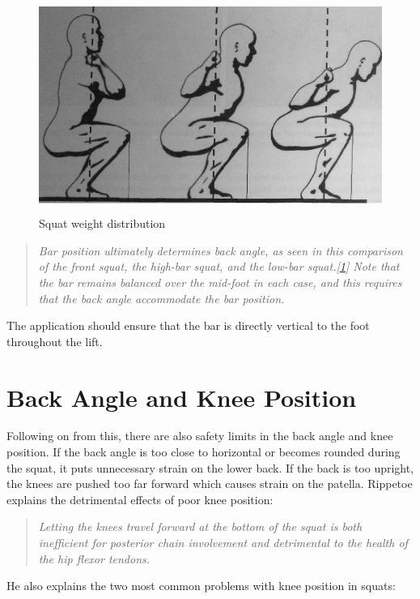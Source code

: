 \begin{figure}[H]
    \centering
	\includegraphics[height=7cm]{squat/images/rippetoe_weight_distro}
\caption{Squat weight distribution}
\label{fig:rippetoe_weight}
\end{figure}

\begin{quote}
\emph{Bar position ultimately determines back angle, as seen in this comparison of the front squat, the high-bar squat, and the low-bar squat.[\ref{fig:rippetoe_weight}] Note that the bar remains balanced over the mid-foot in each case, and this requires that the back angle accommodate the bar position.}
\end{quote}

The application should ensure that the bar is directly vertical to the foot throughout the lift.

\section{Back Angle and Knee Position}

Following on from this, there are also safety limits in the back angle and knee position. If the back angle is too close to horizontal or becomes rounded during the squat, it puts unnecessary strain on the lower back. If the back is too upright, the knees are pushed too far forward which causes strain on the patella. Rippetoe explains the detrimental effects of poor knee position:

\begin{quote}
\emph{Letting the knees travel forward at the bottom of the squat is both inefficient for posterior chain involvement and detrimental to the health of the hip flexor tendons.}
\end{quote}

He also explains the two most common problems with knee position in squats:

